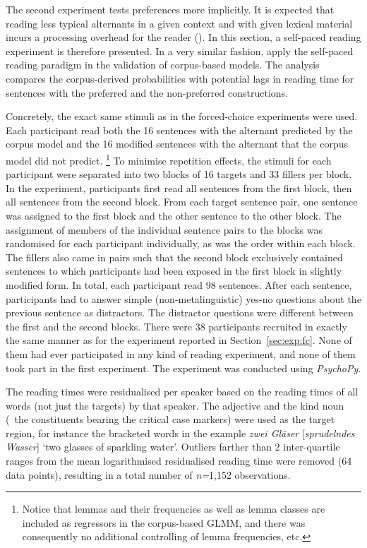 The second experiment tests preferences more implicitly.
It is expected that reading less typical alternants in a given context and with given lexical material incurs a processing overhead for the reader (\citealp{Kaiser2013}).
In this section, a self-paced reading experiment is therefore presented.
In a very similar fashion, \cite{DivjakEa2016} apply the self-paced reading paradigm in the validation of corpus-based models.
The analysis compares the corpus-derived probabilities with potential lags in reading time for sentences with the preferred and the non-preferred constructions.

Concretely, the exact same stimuli as in the forced-choice experiments were used.
Each participant read both the 16 sentences with the alternant predicted by the corpus model and the 16 modified sentences with the alternant that the corpus model did not predict.%
\footnote{Notice that lemmas and their frequencies as well as lemma classes are included as regressors in the corpus-based GLMM, and there was consequently no additional controlling of lemma frequencies, etc.}
To minimise repetition effects, the stimuli for each participant were separated into two blocks of 16 targets and 33 fillers per block.
In the experiment, participants first read all sentences from the first block, then all sentences from the second block.
From each target sentence pair, one sentence was assigned to the first block and the other sentence to the other block.
The assignment of members of the individual sentence pairs to the blocks was randomised for each participant individually, as was the order within each block.
The fillers also came in pairs such that the second block exclusively contained sentences to which participants had been exposed in the first block in slightly modified form.
In total, each participant read 98 sentences.
After each sentence, participants had to answer simple (non-metalinguistic) yes-no questions about the previous sentence as distractors.
The distractor questions were different between the first and the second blocks.
There were 38 participants recruited in exactly the same manner as for the experiment reported in Section~\ref{sec:exp:fc}.
None of them had ever participated in any kind of reading experiment, and none of them took part in the first experiment.
The experiment was conducted using \textit{PsychoPy}.

The reading times were residualised per speaker based on the reading times of all words (not just the targets) by that speaker.
The adjective and the kind noun (\ie\ the constituents bearing the critical case markers) were used as the target region, for instance the bracketed words in the example \textit{zwei Gläser} [\textit{spru\-deln\-des Wasser}] `two glasses of sparkling water'.
Outliers farther than 2 inter-quartile ranges from the mean logarithmised residualised reading time were removed (64 data points), resulting in a total number of \textit{n=}1,152 observations.

